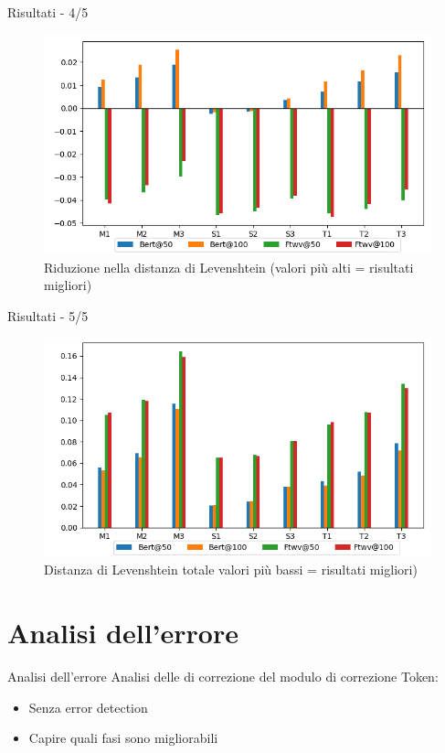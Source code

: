 \documentclass{beamer}
\begin{document}
\begin{frame}{Risultati - 4/5}
\begin{figure}[H]
\includegraphics[width=.9\textwidth]{images/test/ldr}
\caption{Riduzione nella distanza di Levenshtein (valori più alti = risultati migliori)}
\end{figure}
\end{frame}

\begin{frame}{Risultati - 5/5}
\begin{figure}[H]
\includegraphics[width=\textwidth]{images/test/ldt}
\caption{Distanza di Levenshtein totale valori più bassi = risultati migliori)}
\end{figure}
\end{frame}

\section{Analisi dell'errore}
\begin{frame}{Analisi dell'errore}
Analisi delle di correzione del modulo di correzione Token:
\begin{itemize}
\item Senza error detection
\item Capire quali fasi sono migliorabili
\end{itemize}
\end{frame}
\end{document}
